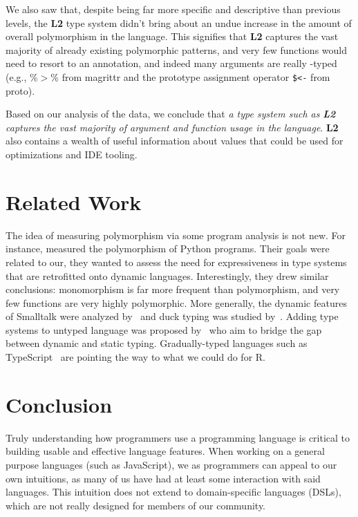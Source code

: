 \documentclass[acmsmall,10pt,review,anonymous]{acmart}\settopmatter{printfolios=true,printccs=false,printacmref=false}
\begin{document}
We also saw that, despite being far more specific and descriptive than previous levels, the {\bf L2} type system didn't bring about an undue increase in the amount of overall polymorphism in the language.
This signifies that {\bf L2} captures the vast majority of already existing polymorphic patterns, and very few functions would need to resort to an \ANY annotation, and indeed many arguments are really \ANY-typed (e.g., \%$>$\% from magrittr and the prototype assignment operator {\tt \$<-} from proto).

Based on our analysis of the data, we conclude that {\it a type system such as} \textbf{\emph{L2}} {\it captures the vast majority of argument and function usage in the language}.
{\bf L2} also contains a wealth of useful information about values that could be used for optimizations and IDE tooling.



%
%
%
%
%

%
%
%
%
\section{Related Work}

The idea of measuring polymorphism via some program analysis is not new.
For instance, \citep{aakerblom2015measuring} measured the polymorphism of
Python programs. Their goals were related to our, they wanted to assess the
need for expressiveness in type systems that are retrofitted onto dynamic
languages.  Interestingly, they drew similar conclusions: monomorphism is
far more frequent than polymorphism, and very few functions are very highly
polymorphic.  More generally, the dynamic features of Smalltalk were
analyzed by~\citep{callau2011howdevelopers} and duck typing was studied
by~\citep{milojkovic2017duck}.  Adding type systems to untyped language was
proposed by~\citep{SiekTaha06} who aim to bridge the gap between dynamic and
static typing.  Gradually-typed languages such as
TypeScript~\cite{typescript13} are pointing the way to what we could do
for R.

%
%
%
%
%
\section{Conclusion}

Truly understanding how programmers use a programming language is critical
to building usable and effective language features.  When working on a
general purpose languages (such as JavaScript), we as programmers can appeal
to our own intuitions, as many of us have had at least some interaction with
said languages.  This intuition does not extend to domain-specific languages
(DSLs), which are not really designed for members of our community.  
\end{document}
